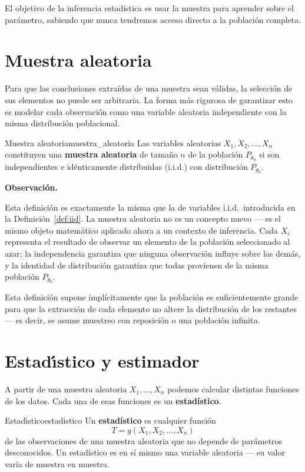 \documentclass[12pt, a4paper]{book}
\newenvironment{observacion}{%
    \par\medskip\noindent\textbf{\color{azul}Observaci\'{o}n.}\enspace\itshape
}{\par\medskip}
\numberwithin{equation}{chapter}
\begin{document}
El objetivo de la inferencia estadística es usar la muestra
para aprender sobre el parámetro, sabiendo que nunca
tendremos acceso directo a la población completa.

\section{Muestra aleatoria}

Para que las conclusiones extraídas de una muestra sean
válidas, la selección de sus elementos no puede ser
arbitraria. La forma más rigurosa de garantizar esto es
modelar cada observación como una variable aleatoria
independiente con la misma distribución poblacional.

\begin{definicion}{Muestra aleatoria}{muestra_aleatoria}
	Las variables aleatorias $X_1, X_2, \ldots, X_n$
	constituyen una \textbf{muestra aleatoria} de tamaño $n$
	de la población $P_{\theta_0}$ si son independientes e
	idénticamente distribuidas (i.i.d.) con distribución
	$P_{\theta_0}$.
\end{definicion}

\begin{observacion}
	Esta definición es exactamente la misma que la de
	variables i.i.d.\ introducida en la
	Definición~\ref{def:iid}. La muestra aleatoria no es un
	concepto nuevo --- es el mismo objeto matemático aplicado
	ahora a un contexto de inferencia. Cada $X_i$ representa
	el resultado de observar un elemento de la población
	seleccionado al azar; la independencia garantiza que
	ninguna observación influye sobre las demás, y la identidad
	de distribución garantiza que todas provienen de la misma
	población $P_{\theta_0}$.
	
	Esta definición supone implícitamente que la población es
	suficientemente grande para que la extracción de cada
	elemento no altere la distribución de los restantes ---
	es decir, se asume muestreo con reposición o una población
	infinita.
\end{observacion}

\section{Estad\'{\i}stico y estimador}

A partir de una muestra aleatoria $X_1, \ldots, X_n$
podemos calcular distintas funciones de los datos. Cada
una de esas funciones es un \textbf{estadístico}.

\begin{definicion}{Estad\'{\i}stico}{estadistico}
	Un \textbf{estadístico} es cualquier función
	\[
	T = g(X_1, X_2, \ldots, X_n)
	\]
	de las observaciones de una muestra aleatoria que no
	depende de parámetros desconocidos. Un estadístico es
	en sí mismo una variable aleatoria --- su valor varía
	de muestra en muestra.
\end{definicion}
\end{document}

